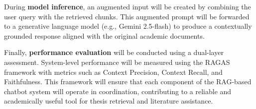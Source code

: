\begin{refsection}
During \textbf{model inference}, an augmented input will be created by combining the user query with the retrieved chunks. This augmented prompt will be forwarded to a generative language model (e.g., Gemini 2.5-flash) to produce a contextually grounded response aligned with the original academic documents.

Finally, \textbf{performance evaluation} will be conducted using a dual-layer assessment. System-level performance will be measured using the RAGAS framework with metrics such as Context Precision, Context Recall, and Faithfulness. This framework will ensure that each component of the RAG-based chatbot system will operate in coordination, contributing to a reliable and academically useful tool for thesis retrieval and literature assistance.

\clearpage

\printbibliography[heading=subbibintoc, title={\centering Notes}]
\end{refsection}
